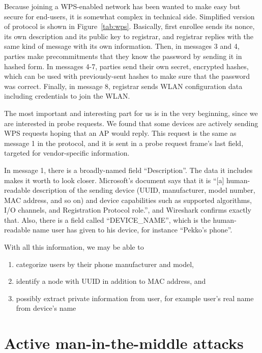 \documentclass[12pt,a4paper,oneside,pdftex]{report}
\begin{document}
Because joining a WPS-enabled network has been wanted to make easy but secure for end-users, it is somewhat complex in technical side. Simplified version of protocol is shown in Figure~\ref{tab:wps}. Basically, first enrollee sends its nonce, its own description and its public key to registrar, and registrar replies with the same kind of message with its own information. Then, in messages 3 and 4, parties make precommitments that they know the password by sending it in hashed form. In messages 4-7, parties send their own secret, encrypted hashes, which can be used with previously-sent hashes to make sure that the password was correct. Finally, in message 8, registrar sends WLAN configuration data including credentials to join the WLAN.

The most important and interesting part for us is in the very beginning, since we are interested in probe requests. We found that some devices are actively sending WPS requests hoping that an AP would reply. This request is the same as message 1 in the protocol, and it is sent in a probe request frame's last field, targeted for vendor-specific information.

In message 1, there is a broadly-named field ``Description''. The data it includes makes it worth to look closer. Microsoft's document says that it is ``[a] human-readable description of the sending device (UUID, manufacturer, model number, MAC address, and so on) and device capabilities such as supported algorithms, I/O channels, and Registration Protocol role.'', and Wireshark confirms exactly that. Also, there is a field called ``DEVICE\_NAME'', which is the human-readable name user has given to his device, for instance ``Pekko's phone''.

With all this information, we may be able to
\begin{enumerate}
    \item categorize users by their phone manufacturer and model,
    \item identify a node with UUID in addition to MAC address, and
    \item possibly extract private information from user, for example user's real name from device's name
\end{enumerate}





\chapter{Active man-in-the-middle attacks}
\label{chapter:attacks}
\end{document}
